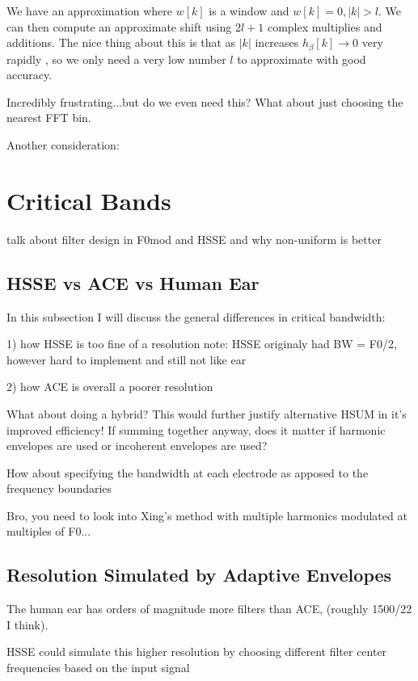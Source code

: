 \documentclass [11pt, proquest] {uwthesis}[2015/03/03]
\begin{document}
We have an approximation where $w[k]$ is a window and $w[k] = 0, |k| > l$.  We can then compute an approximate shift using $2l + 1$ complex multiplies and additions.  The nice thing about this is that as $|k|$ increases $h_\beta[k] \rightarrow 0$ very rapidly , so we only need a very low number $l$ to approximate with good accuracy.






Incredibly frustrating...but do we even need this?  What about just choosing the nearest FFT bin.

Another consideration: 

\section{Critical Bands}

talk about filter design in F0mod and HSSE and why non-uniform is better

\subsection{HSSE vs ACE vs Human Ear}

In this subsection I will discuss the general differences in critical bandwidth:

1) how HSSE is too fine of a resolution
note: HSSE originaly had BW = F0/2, however hard to implement and still not like ear

2) how ACE is overall a poorer resolution

What about doing a hybrid?  This would further justify alternative HSUM in it's improved efficiency!  If summing together anyway, does it matter if harmonic envelopes are used or incoherent envelopes are used?

How about specifying the bandwidth at each electrode as apposed to the frequency boundaries

Bro, you need to look into Xing's method with multiple harmonics modulated at multiples of F0...


\subsection{Resolution Simulated by Adaptive Envelopes}

The human ear has orders of magnitude more filters than ACE, (roughly 1500/22 I think).

HSSE could simulate this higher resolution by choosing different filter center frequencies based on the input signal
\end{document}
